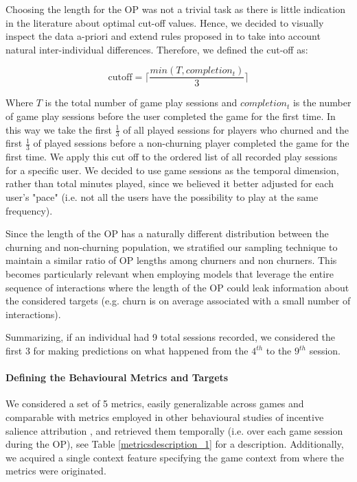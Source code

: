 Choosing the length for the OP was not a trivial task as there is little indication in the literature about optimal cut-off values. Hence, we decided to visually inspect the data a-priori and extend rules proposed in \cite{drachen2016rapid, milovsevic2017early} to take into account natural inter-individual differences. Therefore, we defined the cut-off as:

\begin{equation}
\label{cutoffop}
    \text{cutoff} = 
    \Biggl\lceil
        \dfrac
            {min(T, completion_t)}
            {3}
    \Biggr\rceil
\end{equation}

Where $T$ is the total number of game play sessions and $completion_t$ is the number of game play sessions before the user completed the game for the first time. In this way we take the first $\frac{1}{3}$ of all played sessions for players who churned and the first $\frac{1}{3}$ of played sessions before a non-churning player completed the game for the first time. We apply this cut off to the ordered list of all recorded play sessions for a specific user. We decided to use game sessions as the temporal dimension, rather than total minutes played, since we believed it better adjusted for each user's "pace" (i.e. not all the users have the possibility to play at the same frequency). 

Since the length of the OP has a naturally different distribution between the churning and non-churning population, we stratified our sampling technique to maintain a similar ratio of OP lengths among churners and non churners. This becomes particularly relevant when employing models that leverage the entire sequence of interactions where the length of the OP could leak information about the considered targets (e.g. churn is on average associated with a small number of interactions). 

Summarizing, if an individual had 9 total sessions recorded, we considered the first 3 for making predictions on what happened from the $4^{th}$ to the $9^{th}$ session. 

\paragraph*{Defining the Behavioural Metrics and Targets}
\label{behavioural_metric_targets_1}
We considered a set of 5 metrics, easily generalizable across games and comparable with metrics employed in other behavioural studies of incentive salience attribution \cite{berridge1998role,mcclure2003computational,zhang2009neural}, and retrieved them temporally  (i.e. over each game session during the OP), see Table \ref{metricsdescription_1} for a description. Additionally, we acquired a single context feature specifying the game context from where the metrics were originated. 


